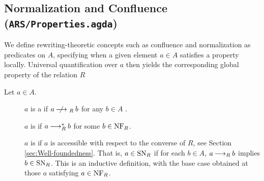 
\subsection{Normalization and Confluence (\texttt{ARS/Properties.agda})}

We define rewriting-theoretic concepts such as confluence and normalization as predicates on $A$, specifying when a given element $a \in A$ satisfies a property locally. Universal quantification over $a$ then yields the corresponding global property of the relation $R$

\begin{definition} Let $a \in A$.
  \begin{description}
    \item[\bq {}] $a$ is a  if $a \nrstep b$ for any $b \in A$ .
    \item[\bq {}] $a$ is  if $a \mathbin{\longrightarrow_R^*} b$ for some $b \in \mathrm{NF}_R$.
    \item[\bq {}] $a$ is  if $a$ is accessible with respect to the converse 
      of $R$, see Section \ref{sec:Well-foundedness}.
      That is, $a \in \mathrm{SN}_R$ if for each $b \in A$, $a \mathbin{\longrightarrow_R} b$ implies $b \in \mathrm{SN}_R$.
        This is an inductive definition, with the base case obtained at
     those $a$ satisfying $a \in \mathrm{NF}_R$.

  \end{description}
\end{definition}

